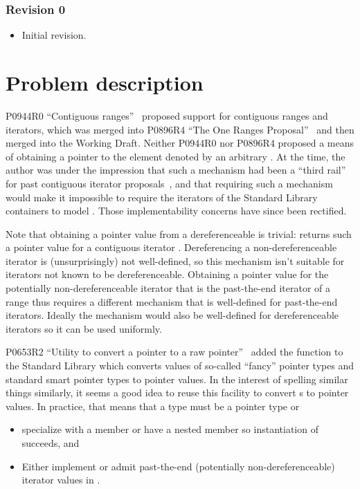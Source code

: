 \subsection{Revision 0}
\begin{itemize}
\item Initial revision.
\end{itemize}

\chapter{Problem description}

P0944R0 ``Contiguous ranges''~\cite{P0944} proposed support for contiguous
ranges and iterators, which was merged into P0896R4 ``The One Ranges
Proposal''~\cite{P0896R4} and then merged into the Working Draft. Neither
P0944R0 nor P0896R4 proposed a means of obtaining a pointer to the element
denoted by an arbitrary . At the time, the author was
under the impression that such a mechanism had been a ``third rail'' for past
contiguous iterator proposals~\cite{N4183}, and that requiring such a mechanism
would make it impossible to require the iterators of the Standard Library
containers to model . Those implementability concerns
have since been rectified.

Note that obtaining a pointer value from a dereferenceable
 is trivial:  returns such a
pointer value for a contiguous iterator . Dereferencing a
non-dereferenceable iterator is (unsurprisingly) not well-defined, so this
mechanism isn't suitable for iterators not known to be dereferenceable.
Obtaining a pointer value for the potentially non-dereferenceable iterator
 that is the past-the-end iterator of a range  thus
requires a different mechanism that is well-defined for past-the-end iterators.
Ideally the mechanism would also be well-defined for dereferenceable iterators
so it can be used uniformly.

P0653R2 ``Utility to convert a pointer to a raw pointer''~\cite{P0653R2} added
the function  to the Standard
Library which converts values of so-called ``fancy'' pointer types and standard
smart pointer types to pointer values. In the interest of spelling similar
things  similarly, it seems a good idea to reuse this facility to convert
s to pointer values. In practice, that means that a
type  must be a pointer type or
\begin{itemize}
\item specialize  with a member 
  or have a nested member 
  so instantiation of  succeeds, and
\item Either implement  or admit
  past-the-end (potentially non-dereferenceable) iterator values in
  .
\end{itemize}

